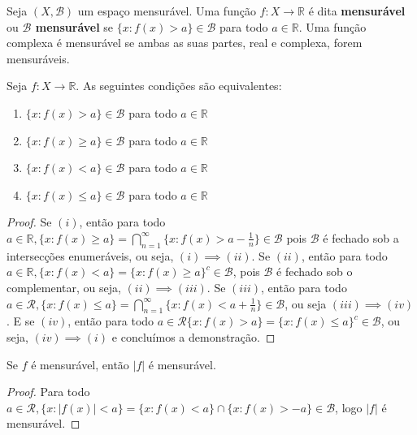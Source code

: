 \begin{definicao}
    Seja $(X,\mathcal{B})$ um espaço mensurável. Uma função $f: X \to \mathbb{R}$ é dita \textbf{mensurável} ou \textbf{$\mathcal{B}$ mensurável} se $\{x: f(x) > a \} \in \mathcal{B}$ para todo $a \in \mathbb{R}$. Uma função complexa é mensurável se ambas as suas partes, real e complexa, forem mensuráveis. 
\end{definicao}

\begin{proposicao} \label{prop4.1}
    Seja $f: X \to \mathbb{R}$. As seguintes condições são equivalentes: 
    \begin{enumerate}[label=(\roman*)]
        \item $\{x: f(x) > a \} \in \mathcal{B}$ para todo $a \in \mathbb{R}$
        \item $\{x: f(x) \geq a \} \in \mathcal{B}$ para todo $a \in \mathbb{R}$
        \item $\{x: f(x) < a \} \in \mathcal{B}$ para todo $a \in \mathbb{R}$
        \item $\{x: f(x) \leq a \} \in \mathcal{B}$ para todo $a \in \mathbb{R}$
    \end{enumerate}
    \begin{proof}
        Se $(i)$, então para todo $a \in \mathbb{R}, \{x : f(x)\geq a \} = \bigcap_{n=1}^\infty \{x : f(x)> a - \frac{1}{n}\} \in \mathcal{B}$ pois $\mathcal{B}$ é fechado sob a intersecções enumeráveis, ou seja, $(i) \implies (ii)$. Se $(ii)$, então para todo $a \in \mathbb{R}, \{x: f(x) < a\} = \{x: f(x) \geq a\}^c \in \mathcal{B}$, pois $\mathcal{B}$ é fechado sob o complementar, ou seja, $(ii) \implies (iii)$. Se $(iii)$, então para todo $a \in \mathcal{R}, \{x: f(x) \leq a\} = \bigcap_{n=1}^\infty \{x : f(x) < a + \frac{1}{n}\} \in \mathcal{B}$, ou seja $(iii) \implies (iv)$. E se $(iv)$, então para todo $a \in \mathcal{R} \{x : f(x) > a \} =  \{x : f(x) \leq a \}^c \in \mathcal{B}$, ou seja, $(iv) \implies (i)$ e concluímos a demonstração.
    \end{proof}
\end{proposicao}

\begin{proposicao}
    Se $f$ é mensurável, então $|f|$ é mensurável.
    \begin{proof}
        Para todo $a \in \mathcal{R}, \{ x : |f(x)| < a \} = \{ x : f(x) < a \} \cap \{ x : f(x) > -a \} \in \mathcal{B}$, logo $|f|$ é mensurável.
    \end{proof}
\end{proposicao}

